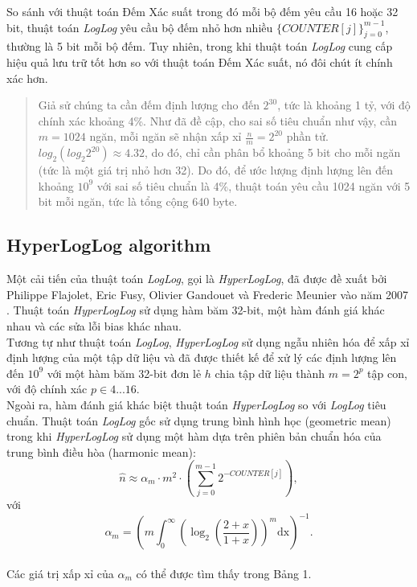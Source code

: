 \documentclass[letterpaper,13pt]{article}
\theoremstyle{mytheor}
\begin{document}
So sánh với thuật toán Đếm Xác suất trong đó mỗi bộ đếm yêu cầu 16 hoặc 32 bit, thuật toán \textit{LogLog} yêu cầu bộ đếm nhỏ hơn 
nhiều $\{COUNTER[j]\}_{j=0}^{m-1}$, thường là 5 bit mỗi bộ đếm. Tuy nhiên, trong khi thuật toán \textit{LogLog} cung cấp hiệu quả lưu trữ tốt hơn 
so với thuật toán Đếm Xác suất, nó đôi chút ít chính xác hơn.\\

\begin{quote}
    Giả sử chúng ta cần đếm định lượng cho đến $2^{30}$, tức là khoảng 1 tỷ, với độ chính xác khoảng 4\%. Như đã đề cập, cho sai số tiêu chuẩn như vậy, 
    cần $m = 1024$ ngăn, mỗi ngăn sẽ nhận xấp xỉ $\frac{n}{m} = 2^{20}$ phần tử.\\
    $log_2\left(log_{2}2^{20}\right) \approx 4.32$, do đó, chỉ cần phân bổ khoảng 5 bit cho mỗi ngăn (tức là một giá trị nhỏ hơn 32). 
    Do đó, để ước lượng định lượng lên đến khoảng $10^9$ với sai số tiêu chuẩn là 4\%, thuật toán yêu cầu 1024 ngăn với 5 bit mỗi ngăn, 
    tức là tổng cộng 640 byte.
    \vspace{0.25cm}
\end{quote}
\vspace{0.25cm}
\subsection{HyperLogLog algorithm}
Một cải tiến của thuật toán \textit{LogLog}, gọi là \textit{HyperLogLog}, đã được đề xuất bởi Philippe Flajolet, Eric Fusy, Olivier Gandouet và 
Frederic Meunier vào năm 2007 \cite{flajolet2007hyperloglog}. Thuật toán \textit{HyperLogLog} sử dụng hàm băm 32-bit, một hàm đánh giá khác nhau và các sửa lỗi bias khác nhau.\\

Tương tự như thuật toán \textit{LogLog}, \textit{HyperLogLog} sử dụng ngẫu nhiên hóa để xấp xỉ định lượng của một tập dữ liệu và đã được 
thiết kế để xử lý các định lượng lên đến $10^9$ với một hàm băm 32-bit đơn lẻ $h$ chia tập dữ liệu thành $m = 2^p$ tập con, với độ chính xác $p \in 4...16$.\\

Ngoài ra, hàm đánh giá khác biệt thuật toán \textit{HyperLogLog} so với \textit{LogLog} tiêu chuẩn. Thuật toán \textit{LogLog} gốc sử dụng 
trung bình hình học (geometric mean) trong khi \textit{HyperLogLog} sử dụng một hàm dựa trên phiên bản chuẩn hóa của trung bình điều hòa (harmonic mean):
\[
    \hat{n} \approx \alpha_m \cdot m^2 \cdot \left(\sum_{j=0}^{m-1}2^{-COUNTER[j]}\right),
\]
\indent với
\[
    \alpha_m = \left(m\int_0^\infty\left(\log_2\left(\frac{2+x}{1+x}\right)\right)^m\text{dx}\right)^{-1}.    
\]\\
\newpage
\indent Các giá trị xấp xỉ của $\alpha_m$ có thể được tìm thấy trong Bảng 1.\\
\end{document}
